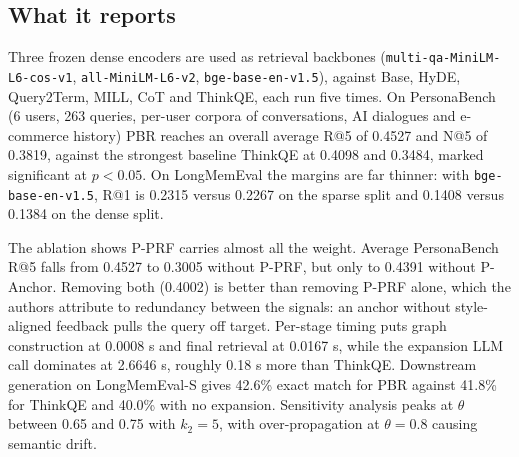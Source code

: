 \subsection{What it reports}

Three frozen dense encoders are used as retrieval backbones (\texttt{multi-qa-MiniLM-L6-cos-v1}, \texttt{all-MiniLM-L6-v2}, \texttt{bge-base-en-v1.5}), against Base, HyDE, Query2Term, MILL, CoT and ThinkQE, each run five times. On PersonaBench (6 users, 263 queries, per-user corpora of conversations, AI dialogues and e-commerce history) PBR reaches an overall average R@5 of 0.4527 and N@5 of 0.3819, against the strongest baseline ThinkQE at 0.4098 and 0.3484, marked significant at $p<0.05$. On LongMemEval the margins are far thinner: with \texttt{bge-base-en-v1.5}, R@1 is 0.2315 versus 0.2267 on the sparse split and 0.1408 versus 0.1384 on the dense split.

The ablation shows P-PRF carries almost all the weight. Average PersonaBench R@5 falls from 0.4527 to 0.3005 without P-PRF, but only to 0.4391 without P-Anchor. Removing both (0.4002) is better than removing P-PRF alone, which the authors attribute to redundancy between the signals: an anchor without style-aligned feedback pulls the query off target. Per-stage timing puts graph construction at 0.0008 s and final retrieval at 0.0167 s, while the expansion LLM call dominates at 2.6646 s, roughly 0.18 s more than ThinkQE. Downstream generation on LongMemEval-S gives 42.6\% exact match for PBR against 41.8\% for ThinkQE and 40.0\% with no expansion. Sensitivity analysis peaks at $\theta$ between 0.65 and 0.75 with $k_2=5$, with over-propagation at $\theta=0.8$ causing semantic drift.

